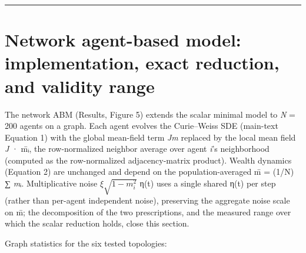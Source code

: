 \documentclass[11pt,letterpaper]{article}
\begin{document}
\begin{center}\rule{0.5\linewidth}{0.5pt}\end{center}

\section{Network agent-based model: implementation, exact reduction, and validity range}\label{network-agent-based-model-implementation-exact-reduction-and-validity-range}

The network ABM (Results, Figure 5) extends the scalar minimal model to \emph{N} = 200 agents on a graph. Each agent evolves the Curie--Weiss SDE (main-text Equation 1) with the global mean-field term \emph{Jm} replaced by the local mean field \emph{J} · m̄ᵢ, the row-normalized neighbor average over agent \emph{i}'s neighborhood (computed as the row-normalized adjacency-matrix product). Wealth dynamics (Equation 2) are unchanged and depend on the population-averaged m̄ = (1/N) ∑ \emph{m}ᵢ. Multiplicative noise \(\xi \sqrt{1-m_i^2}\) η(t) uses a single shared η(t) per step (rather than per-agent independent noise), preserving the aggregate noise scale on m̄; the decomposition of the two prescriptions, and the measured range over which the scalar reduction holds, close this section.

Graph statistics for the six tested topologies:
\end{document}
